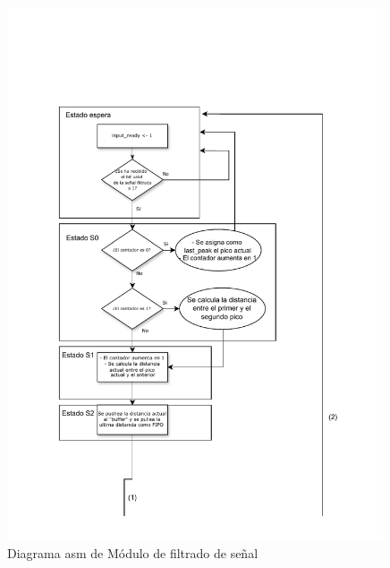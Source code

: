 \begin{figure}[h!]
    \centering
    \includegraphics[width=0.99\textwidth]{./Images/img_implementacion_hw/Diagramaasmarritmias1.pdf}
    \caption{Diagrama asm de Módulo de filtrado de señal}
    \label{fig:Diagramaasmarritmias1}
\end{figure} 

